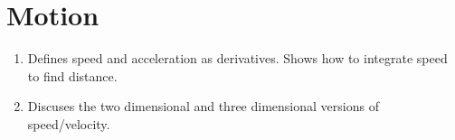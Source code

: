 \section{Motion}

\begin{enumerate}
  \item Defines speed and acceleration as derivatives. Shows how to
  integrate speed to find distance.

  \item Discuses the two dimensional and three dimensional versions of
  speed/velocity.
\end{enumerate}
